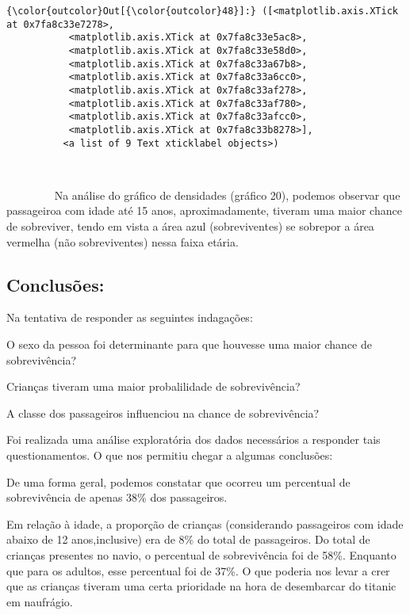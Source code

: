 \documentclass[11pt]{article}
\begin{document}
\begin{Verbatim}[commandchars=\\\{\}]
{\color{outcolor}Out[{\color{outcolor}48}]:} ([<matplotlib.axis.XTick at 0x7fa8c33e7278>,
           <matplotlib.axis.XTick at 0x7fa8c33e5ac8>,
           <matplotlib.axis.XTick at 0x7fa8c33e58d0>,
           <matplotlib.axis.XTick at 0x7fa8c33a67b8>,
           <matplotlib.axis.XTick at 0x7fa8c33a6cc0>,
           <matplotlib.axis.XTick at 0x7fa8c33af278>,
           <matplotlib.axis.XTick at 0x7fa8c33af780>,
           <matplotlib.axis.XTick at 0x7fa8c33afcc0>,
           <matplotlib.axis.XTick at 0x7fa8c33b8278>],
          <a list of 9 Text xticklabel objects>)
\end{Verbatim}
            
    \begin{center}
    \end{center}
    { \hspace*{\fill} \\}
    
         Na análise do gráfico de densidades (gráfico 20), podemos observar
que passageiroa com idade até 15 anos, aproximadamente, tiveram uma
maior chance de sobreviver, tendo em vista a área azul (sobreviventes)
se sobrepor a área vermelha (não sobreviventes) nessa faixa etária.

    \subsection{Conclusões:}\label{conclusuxf5es}

    Na tentativa de responder as seguintes indagações:

O sexo da pessoa foi determinante para que houvesse uma maior chance de
sobrevivência?

Crianças tiveram uma maior probalilidade de sobrevivência?

A classe dos passageiros influenciou na chance de sobrevivência?

Foi realizada uma análise exploratória dos dados necessários a responder
tais questionamentos. O que nos permitiu chegar a algumas conclusões:

De uma forma geral, podemos constatar que ocorreu um percentual de
sobrevivência de apenas 38\% dos passageiros.

Em relação à idade, a proporção de crianças (considerando passageiros
com idade abaixo de 12 anos,inclusive) era de 8\% do total de
passageiros. Do total de crianças presentes no navio, o percentual de
sobrevivência foi de 58\%. Enquanto que para os adultos, esse percentual
foi de 37\%. O que poderia nos levar a crer que as crianças tiveram uma
certa prioridade na hora de desembarcar do titanic em naufrágio.
\end{document}
